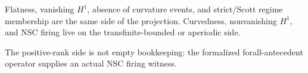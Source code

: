 \begin{theorem}\label{thm:curvature-regime-correspondence}\leanok{}
Flatness, vanishing \(H^1\), absence of curvature events, and strict/Scott
regime membership are the same side of the projection.  Curvedness,
nonvanishing \(H^1\), and NSC firing live on the transfinite-bounded or
aperiodic side.
\end{theorem}

\begin{theorem}\label{thm:curvature-rank-has-nsc-firing}\leanok{}
The positive-rank side is not empty bookkeeping: the formalized
forall-antecedent operator supplies an actual NSC firing witness.
\end{theorem}
